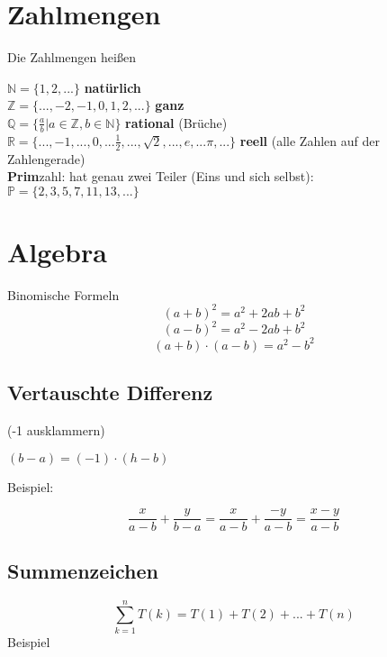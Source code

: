 \begin{multicols}{2}%

\section{Zahlmengen}
\begin{definition}{}{}
Die Zahlmengen heißen

$\mathbb{N} = \{1,2, ...\}$                                   \textbf{natürlich}\\
$\mathbb{Z} = \{..., -2, -1, 0, 1,2, ...\}$                   \textbf{ganz}\\
$\mathbb{Q} = \{\frac{a}b|a\in \mathbb{Z},b\in\mathbb{N}\}$   \textbf{rational} (Brüche)\\
$\mathbb{R} = \{..., -1, ..., 0, ... \frac12, ..., \sqrt{2}, ..., e, ... \pi, ...\}  $ \textbf{reell} (alle Zahlen auf der Zahlengerade)\\

\textbf{Prim}zahl: hat genau zwei Teiler (Eins und sich selbst):\\ $\mathbb{P} = \{2, 3, 5, 7, 11, 13, ...\}$
\end{definition}

\hrulefill%

\section{Algebra}

\begin{gesetz}{Binomische Formeln}{}
$$(a+b)^2 = a^2+2ab + b^2$$
$$(a-b)^2=a^2-2ab+b^2$$
$$(a+b)\cdot(a-b) = a^2 - b^2$$
\end{gesetz}

\subsection{Vertauschte Differenz}
(-1 ausklammern)

$(b-a)=(-1)\cdot{}(h-b)$

Beispiel:

$$\frac{x}{a-b} +  \frac{y}{b-a} = \frac{x}{a-b} + \frac{-y}{a-b} = \frac{x-y}{a-b}$$

\forceCB
\subsection{Summenzeichen}
$$\sum_{k=1}^n{T(k)} = T(1) + T(2) + ... + T(n)$$
Beispiel


\end{multicols}
